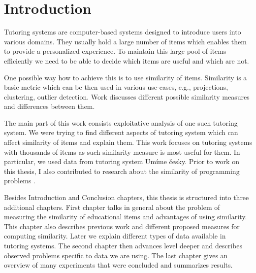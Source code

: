 \documentclass[
  digital, %
  table,   %
  nolof,     %
  nolot,     %
  nocover,
  color,
  final, %
]{fithesis3}
\begin{document}
\newcommand{\ppl}[1]{\textcolor[rgb]{0.6,0.2,1.0}{#1}}
\newcommand{\umimeCesky}{Umíme česky}



\chapter*{Introduction}



Tutoring systems are computer-based systems designed to introduce users into various domains. They usually hold a large number of items which enables them to provide a personalized experience. To maintain this large pool of items efficiently we need to be able to decide which items are useful and which are not.


One possible way how to achieve this is to use similarity of items. Similarity is a basic metric which can be then used in various use-cases, e.g., projections, clustering, outlier detection. Work discusses different possible similarity measures and differences between them.


The main part of this work consists exploitative analysis of one such tutoring system. We were trying to find different aspects of tutoring system which can affect similarity of items and explain them. This work focuses on tutoring systems with thousands of items as such similarity measure is most useful for them. In particular, we used data from tutoring system \umimeCesky{}. Prior to work on this thesis, I also contributed to research about the similarity of programming problems \cite{pelanek2018programming}.


Besides Introduction and Conclusion chapters, this thesis is structured into three additional chapters. First chapter talks in general about the problem of measuring the similarity of educational items and advantages of using similarity. This chapter also describes previous work and different proposed measures for computing similarity. Later we explain different types of data available in tutoring systems. The second chapter then advances level deeper and describes observed problems specific to data we are using.
The last chapter gives an overview of many experiments that were concluded and summarizes results.
\end{document}
